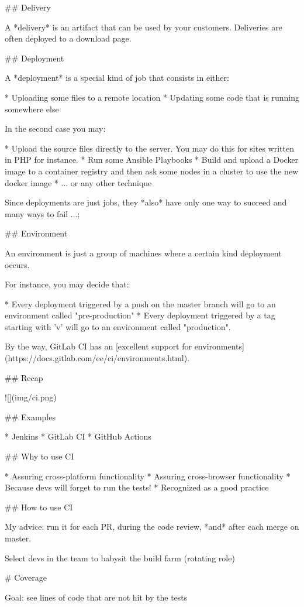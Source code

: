 ## Delivery

A *delivery* is an artifact that can be used by your customers.
Deliveries are often deployed to a download page.

## Deployment

A *deployment* is a special kind of job that consists in either:

* Uploading some files to a remote location
* Updating some code that is running somewhere else

In the second case you may:

* Upload the source files directly to the server. You may do this for sites written in PHP for instance.
* Run some Ansible Playbooks
* Build and upload a Docker image to a container registry and then ask some nodes in a cluster to use the new docker image
* ... or any other technique

Since deployments are just jobs, they *also* have only one way to succeed and many ways to fail ...;

## Environment

An environment is just a group of machines where a certain kind deployment occurs.

For instance, you may decide that:

* Every deployment triggered by a push on the master branch will go to an environment called "pre-production"
* Every deployment triggered by a tag starting with 'v' will go to an environment called "production".

By the way, GitLab CI has an [excellent support for
environments](https://docs.gitlab.com/ee/ci/environments.html).

## Recap

![](img/ci.png)

## Examples

* Jenkins
* GitLab CI
* GitHub Actions


## Why to use CI

* Assuring cross-platform functionality
* Assuring cross-browser functionality
* Because devs will forget to run the tests!
* Recognized as a good practice

## How to use CI

My advice: run it for each PR, during the code review,
*and* after each merge on master.

Select devs in the team to babysit the build farm (rotating role)


# Coverage

Goal: see lines of code that are not hit by the tests

